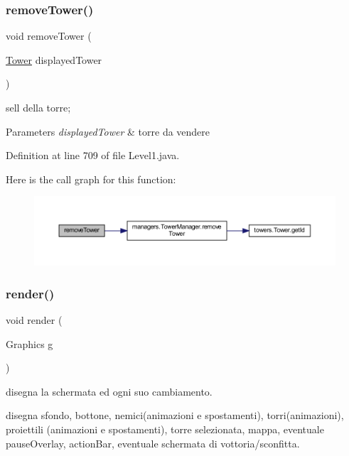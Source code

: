 \subsubsection{\texorpdfstring{remove\+Tower()}{removeTower()}}
{\footnotesize\ttfamily void remove\+Tower (\begin{DoxyParamCaption}\item[{\hyperlink{classtowers_1_1_tower}{Tower}}]{displayed\+Tower }\end{DoxyParamCaption})}



sell della torre; 


\begin{DoxyParams}{Parameters}
{\em displayed\+Tower} & torre da vendere \\
\hline
\end{DoxyParams}


Definition at line 709 of file Level1.\+java.

Here is the call graph for this function\+:\nopagebreak
\begin{figure}[H]
\begin{center}
\leavevmode
\includegraphics[width=350pt]{classscenes_1_1_level1_addba85b44e35a186e066b2e801f433c4_cgraph}
\end{center}
\end{figure}
\mbox{\label{classscenes_1_1_level1_a203b6ad9d5e4d54dd1152986eec4dedc}} 
\subsubsection{\texorpdfstring{render()}{render()}}
{\footnotesize\ttfamily void render (\begin{DoxyParamCaption}\item[{Graphics}]{g }\end{DoxyParamCaption})}



disegna la schermata ed ogni suo cambiamento. 

disegna sfondo, bottone, nemici(animazioni e spostamenti), torri(animazioni), proiettili (animazioni e spostamenti), torre selezionata, mappa, eventuale pause\+Overlay, action\+Bar, eventuale schermata di vottoria/sconfitta.


